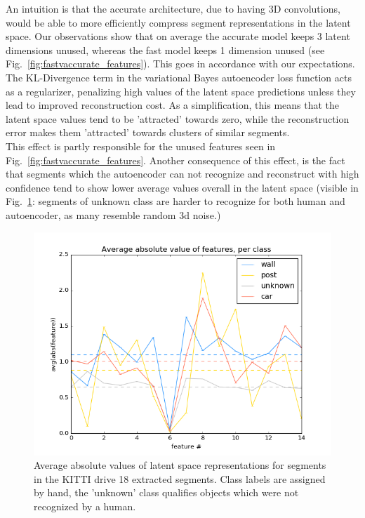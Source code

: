 An intuition is that the accurate architecture, due to having 3D convolutions, would be able to more efficiently compress segment representations in the latent space. Our observations show that on average the accurate model keeps 3 latent dimensions unused, whereas the fast model keeps 1 dimension unused (see Fig.~\ref{fig:fastvaccurate_features}). This goes in accordance with our expectations.\\

The KL-Divergence term in the variational Bayes autoencoder loss function acts as a regularizer, penalizing high values of the latent space predictions unless they lead to improved reconstruction cost. As a simplification, this means that the latent space values tend to be 'attracted' towards zero, while the reconstruction error makes them 'attracted' towards clusters of similar segments.\\

This effect is partly responsible for the unused features seen in Fig.~\ref{fig:fastvaccurate_features}. Another consequence of this effect, is the fact that segments which the autoencoder can not recognize and reconstruct with high confidence tend to show lower average values overall in the latent space (visible in Fig.~\ref{fig:avg_abs_features}: segments of unknown class are harder to recognize for both human and autoencoder, as many resemble random 3d noise.)

\begin{figure}
  \centering
  \includegraphics[width=5.2in]{images/avg_abs_features.png}
  \caption{Average absolute values of latent space representations for segments in the KITTI drive 18 extracted segments. Class labels are assigned by hand, the 'unknown' class qualifies objects which were not recognized by a human.}
  \label{fig:avg_abs_features}
\end{figure}

